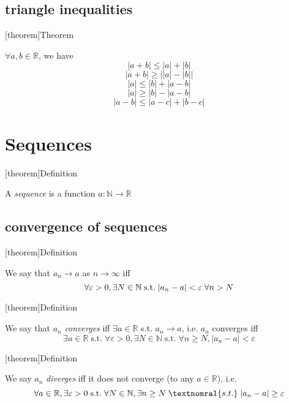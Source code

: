 \documentclass[12pt]{report}
\theoremstyle{definition}
\begin{document}
\section{triangle inequalities}
[theorem]{Theorem}
\begin{basic triangle ineq}
    $\forall a, b \in \mathbb{R}$, we have\[
        |a + b| \le |a| + |b|
    \]\[
        |a + b| \ge \Big||a| - |b|\Big|
    \]\[
        |a| \le |b| + |a - b|
    \]\[
        |a| \ge |b| - |a - b|
    \]\[
        |a - b| \le |a - c| + |b - c|
    \]
\end{basic triangle ineq}

\chapter{Sequences}
[theorem]{Definition}
\begin{sequence}
    A \emph{sequence} is a function $a : \mathbb{N} \rightarrow \mathbb{R}$
\end{sequence}

\section{convergence of sequences}
[theorem]{Definition}
\begin{convergence}
    We say that $a_n \rightarrow a$ as $n \rightarrow \infty$ iff \[
        \forall \varepsilon > 0, \exists N \in \mathbb{N} \;\textnormal{s.t.} \; |a_n - a| < \varepsilon \;\forall n > N
    \]
\end{convergence}

[theorem]{Definition}
\begin{convergent sequence}
    We say that $a_n$ \emph{converges} iff $\exists a \in \mathbb{R}$ s.t. $a_n \rightarrow a$, i.e. $a_n$ converges iff\[
        \exists a \in \mathbb{R} \;\text{s.t.}\; \forall \varepsilon > 0, \exists N \in \mathbb{N} 
        \;\text{s.t.}\; \forall n \ge N, |a_n - a| < \varepsilon
    \]
\end{convergent sequence}

[theorem]{Definition}
\begin{divergent sequence}
    We say $a_n$ \emph{diverges} iff it does not converge (to any $a \in \mathbb{R}$), i.e. \[
        \forall a \in \mathbb{R}, \exists \varepsilon > 0 \;\textnormal{s.t.}\; \forall N \in \mathbb{N},
        \exists n \ge N \;\textnomral{s.t.}\; |a_n - a| \ge \varepsilon
    \]
\end{divergent sequence}
\end{document}
